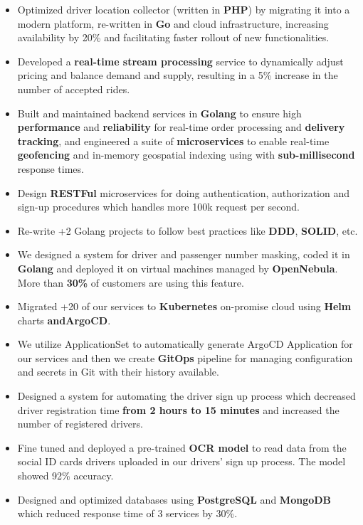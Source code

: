 \vspace{0.5cm}

\begin{itemize}
      \item Optimized driver location collector (written in \textbf{PHP}) by migrating it into a modern platform, re-written in \textbf{Go} and cloud infrastructure,
            increasing availability by 20\% and facilitating faster rollout of new functionalities.
      \item Developed a \textbf{real-time stream processing} service to dynamically adjust pricing and balance demand and supply,
            resulting in a 5\% increase in the number of accepted rides.
      \item Built and maintained backend services in \textbf{Golang} to ensure
            high \textbf{performance} and \textbf{reliability} for real-time order processing and \textbf{delivery tracking},
            and engineered a suite of \textbf{microservices} to enable real-time \textbf{geofencing} and in-memory geospatial
            indexing using  with \textbf{sub-millisecond} response times.
      \item Design \textbf{RESTFul} microservices for doing authentication, authorization and sign-up procedures which handles more 100k request per second.
      \item Re-write +2 Golang projects to follow best practices like \textbf{DDD}, \textbf{SOLID}, etc.
      \item We designed a system for driver and passenger number masking, coded it in \textbf{Golang}
            and deployed it on virtual machines managed by \textbf{OpenNebula}. More than \textbf{30\%} of customers are using this feature.
      \item Migrated +20 of our services to \textbf{Kubernetes} on-promise cloud using \textbf{Helm} charts \textbf{andArgoCD}.
      \item We utilize  ApplicationSet to automatically generate ArgoCD Application
            for our services and then we create \textbf{GitOps} pipeline for managing configuration
            and secrets in Git with their history available.
      \item Designed a system for automating the driver sign up process which decreased driver registration time \textbf{from 2 hours to 15 minutes} and increased the number of registered drivers.
      \item Fine tuned and deployed a pre-trained \textbf{OCR model} to read data from the social ID cards drivers uploaded in our drivers' sign up process. The model showed 92\% accuracy.
      \item Designed and optimized databases using \textbf{PostgreSQL} and \textbf{MongoDB} which reduced response time of 3 services by 30\%.
\end{itemize}

